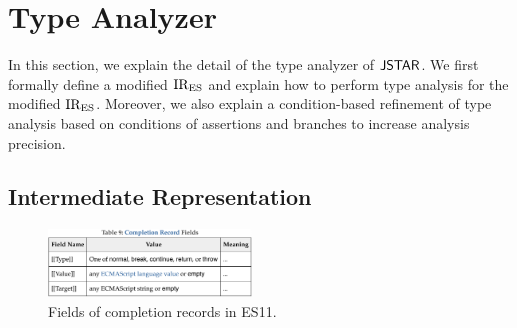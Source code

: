 \section{Type Analyzer}\label{sec:analyzer}

In this section, we explain the detail of the type analyzer of $\tool$. We first
formally define a modified ${\text{IR}_\text{ES}}$ and explain how to perform type analysis for
the modified ${\text{IR}_\text{ES}}$.  Moreover, we also explain a condition-based refinement of
type analysis based on conditions of assertions and branches to increase
analysis precision.

\subsection{Intermediate Representation}\label{sec:ires}

\begin{figure}
  \centering
  \includegraphics[width=0.48\textwidth]{img/record-fields-table}
  \caption{Fields of completion records in ES11.}
  \label{fig:record-fields-table}
  \vspace*{-1.5em}
\end{figure}


